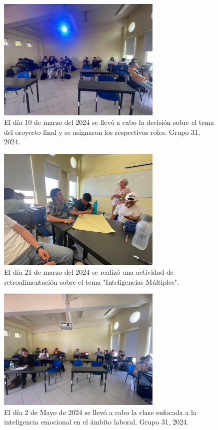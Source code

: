 \begin{figure}
    \caption{El día 10 de marzo del 2024 se llevó a cabo la decisión sobre el tema del oroyecto final y se asignaron los respectivos roles. Grupo 31, 2024.\label{fig:No.1}}
    \includegraphics[width=0.7\textwidth]{./assets/img/imagen2DH.jpeg}
\end{figure}

\begin{figure}
    \caption{El día 21 de marzo del 2024 se realizó una actividad de retroalimentación sobre el tema "Inteligencias Múltiples".\label{fig:No.2}}
    \includegraphics[width=0.7\textwidth]{./assets/img/imagen1DH.jpeg}
\end{figure}

\begin{figure}
    \caption{El día 2 de Mayo de 2024 se llevó a cabo la clase enfocada a la inteligencia emocional en el ámbito laboral. Grupo 31, 2024.\label{fig:No.3}}
    \includegraphics[width=0.7\textwidth]{./assets/img/imagen3DH.jpeg}
\end{figure}

